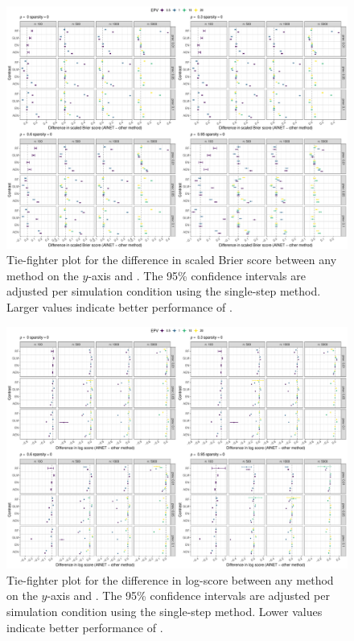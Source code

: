\begin{subappendices}
\begin{landscape}
\begin{figure}[!ht]
\center
\includegraphics[width=0.9\linewidth]{images/paper6/tie-fighter_scaledBrier_sparsity0.pdf}
\caption{Tie-fighter plot for the difference in scaled Brier score between any
  method on the $y$-axis and \ainet{}. The 95\% confidence intervals are adjusted
  per simulation condition using the single-step method. Larger
  values indicate better performance of \ainet{}. } \label{fig6:tiesbrier}
\end{figure}
\end{landscape}

\begin{landscape}
\begin{figure}[!ht]
\center
\includegraphics[width=0.9\linewidth]{images/paper6/tie-fighter_nll_sparsity0.pdf}
\caption{Tie-fighter plot for the difference in log-score between any method on
  the $y$-axis and \ainet{}. The 95\% confidence intervals are adjusted per
  simulation condition using the single-step method. Lower values indicate
  better performance of \ainet{}. } \label{fig6:tienll}
\end{figure}
\end{landscape}


\end{subappendices}
